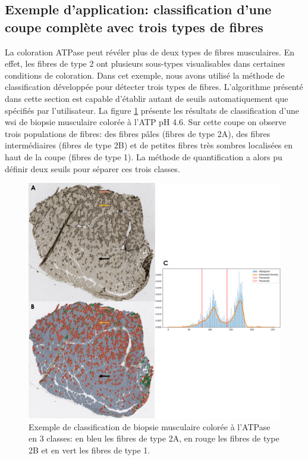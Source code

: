 \subsection{Exemple d'application: classification d'une coupe complète avec trois types de fibres}
La coloration ATPase peut révéler plus de deux types de fibres musculaires. En effet, les fibres de type 2 ont plusieurs sous-types visualisables dans certaines conditions de coloration. Dans cet exemple, nous avons utilisé la méthode de classification développée pour détecter trois types de fibres. L'algorithme présenté dans cette section est capable d'établir autant de seuils automatiquement que spécifiés par l'utilisateur. La figure \ref{fig:atp_paint_wsi} présente les résultats de classification d'une \gls{wsi} de biopsie musculaire colorée à l'ATP pH 4.6. Sur cette coupe on observe trois populations de fibres: des fibres pâles (fibres de type 2A), des fibres intermédiaires (fibres de type 2B) et de petites fibres très sombres localisées en haut de la coupe (fibres de type 1). La méthode de quantification a alors pu définir deux seuils pour séparer ces trois classes. 
\begin{figure}[!ht]
 \centering
 \includegraphics[width=1\textwidth]{figures/atp_wsi.png}
 \caption[Exemple de classification de biopsie musculaire colorée à l'ATPase]{Exemple de classification de biopsie musculaire colorée à l'ATPase en 3 classes: en bleu les fibres de type 2A, en rouge les fibres de type 2B et en vert les fibres de type 1.}
 \label{fig:atp_paint_wsi}
\end{figure}


